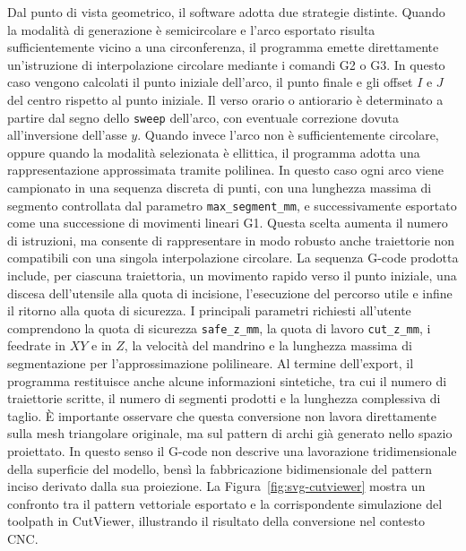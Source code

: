 \documentclass[a4paper,11pt,titlepage,twoside]{book}
\newcommand{\1}{\mathbf{1}}
\numberwithin{equation}{chapter}
\theoremstyle{plain}
\theoremstyle{definition}
\begin{document}
	Dal punto di vista geometrico, il software adotta due strategie distinte. Quando la modalità di generazione è semicircolare e l’arco esportato risulta sufficientemente vicino a una circonferenza, il programma emette direttamente un’istruzione di interpolazione circolare mediante i comandi G2 o G3\cite{Kramer2000}. In questo caso vengono calcolati il punto iniziale dell’arco, il punto finale e gli offset \(I\) e \(J\) del centro rispetto al punto iniziale. Il verso orario o antiorario è determinato a partire dal segno dello \texttt{sweep} dell’arco, con eventuale correzione dovuta all’inversione dell’asse \(y\).
	Quando invece l’arco non è sufficientemente circolare, oppure quando la modalità selezionata è ellittica, il programma adotta una rappresentazione approssimata tramite polilinea. In questo caso ogni arco viene campionato in una sequenza discreta di punti, con una lunghezza massima di segmento controllata dal parametro \texttt{max\_segment\_mm}, e successivamente esportato come una successione di movimenti lineari G1. Questa scelta aumenta il numero di istruzioni, ma consente di rappresentare in modo robusto anche traiettorie non compatibili con una singola interpolazione circolare.
	La sequenza G-code prodotta include, per ciascuna traiettoria, un movimento rapido verso il punto iniziale, una discesa dell’utensile alla quota di incisione, l’esecuzione del percorso utile e infine il ritorno alla quota di sicurezza\cite{Smid2020}. I principali parametri richiesti all’utente comprendono la quota di sicurezza \texttt{safe\_z\_mm}, la quota di lavoro \texttt{cut\_z\_mm}, i feedrate in \(XY\) e in \(Z\), la velocità del mandrino e la lunghezza massima di segmentazione per l’approssimazione polilineare\cite{Smid2020}. Al termine dell’export, il programma restituisce anche alcune informazioni sintetiche, tra cui il numero di traiettorie scritte, il numero di segmenti prodotti e la lunghezza complessiva di taglio.
	È importante osservare che questa conversione non lavora direttamente sulla mesh triangolare originale, ma sul pattern di archi già generato nello spazio proiettato. In questo senso il G-code non descrive una lavorazione tridimensionale della superficie del modello, bensì la fabbricazione bidimensionale del pattern inciso derivato dalla sua proiezione. La Figura~\ref{fig:svg-cutviewer} mostra un confronto tra il pattern vettoriale esportato e la corrispondente simulazione del toolpath in CutViewer, illustrando il risultato della conversione nel contesto CNC.
	
\end{document}

